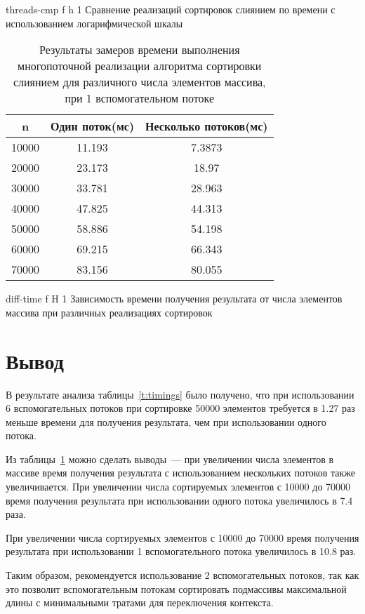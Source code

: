 {threads-cmp}
{f} 
{h} 
{1\textwidth} 
{Сравнение реализаций сортировок слиянием по времени с использованием логарифмической шкалы}

\begin{table}[H]
	\centering
	\caption{Результаты замеров времени выполнения многопоточной реализации алгоритма сортировки слиянием для различного числа элементов массива, при 1 вспомогательном потоке}
	\begin{tabular}{|c|c|c|}
		\hline
		n       & Один поток(мс) & Несколько потоков(мс) \\ \hline
		10000 & 11.193                  & 7.3873                            \\ \hline
		20000 & 23.173                  & 18.97                             \\ \hline
		30000 & 33.781                  & 28.963                            \\ \hline
		40000 & 47.825                  & 44.313                            \\ \hline
		50000 & 58.886                  & 54.198                            \\ \hline
		60000 & 69.215                  & 66.343                            \\ \hline
		70000 & 83.156                  & 80.055                            \\ \hline
	\end{tabular}
	\label{t:timings-n}
\end{table}

{diff-time}
{f}
{H} 
{1\textwidth} 
{Зависимость времени получения результата от числа элементов массива при различных реализациях сортировок}

\section*{Вывод}
В результате анализа таблицы~\ref{t:timings} было получено, что при использовании 6 вспомогательных потоков при сортировке 50000 элементов требуется в 1.27 раз меньше времени для получения результата, чем при использовании одного потока. 

Из таблицы~\ref{t:timings-n} можно сделать выводы~--- при увеличении числа элементов в массиве
время получения результата с использованием нескольких потоков также увеличивается. При увеличении числа сортируемых элементов с 10000 до 70000 время получения результата при использовании одного потока увеличилось в 7.4 раза.

При увеличении числа сортируемых элементов с 10000 до 70000 время получения результата при использовании 1 вспомогательного потока увеличилось в 10.8 раз.

Таким образом, рекомендуется использование 2 вспомогательных потоков, так как это позволит вспомогательным потокам сортировать подмассивы максимальной длины с минимальными тратами для переключения контекста.
